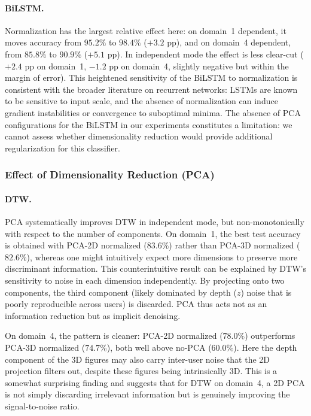 \paragraph{BiLSTM.}
Normalization has the largest relative effect here: on domain~1 dependent, it moves
accuracy from $95.2\%$ to $98.4\%$ ($+3.2$ pp), and on domain~4 dependent, from
$85.8\%$ to $90.9\%$ ($+5.1$ pp). In independent mode the effect is less clear-cut
($+2.4$ pp on domain~1, $-1.2$ pp on domain~4, slightly negative but within the
margin of error). This heightened sensitivity of the BiLSTM to normalization is
consistent with the broader literature on recurrent networks: LSTMs are known to be
sensitive to input scale, and the absence of normalization can induce gradient
instabilities or convergence to suboptimal minima. The absence of PCA configurations
for the BiLSTM in our experiments constitutes a limitation: we cannot assess whether
dimensionality reduction would provide additional regularization for this classifier.

\subsubsection{Effect of Dimensionality Reduction (PCA)}

\paragraph{DTW.}
PCA systematically improves DTW in independent mode, but non-monotonically with respect
to the number of components. On domain~1, the best test accuracy is obtained with PCA-2D
normalized ($83.6\%$) rather than PCA-3D normalized ($82.6\%$), whereas one might
intuitively expect more dimensions to preserve more discriminant information. This
counterintuitive result can be explained by DTW's sensitivity to noise in each dimension
independently. By projecting onto two components, the third component (likely
dominated by depth ($z$) noise that is poorly reproducible across users) is discarded.
PCA thus acts not as an information reduction but as implicit denoising.

On domain~4, the pattern is cleaner: PCA-2D normalized ($78.0\%$) outperforms PCA-3D
normalized ($74.7\%$), both well above no-PCA ($60.0\%$). Here the depth component of
the 3D figures may also carry inter-user noise that the 2D projection filters out,
despite these figures being intrinsically 3D\@. This is a somewhat surprising finding and
suggests that for DTW on domain~4, a 2D PCA is not simply discarding irrelevant
information but is genuinely improving the signal-to-noise ratio.

